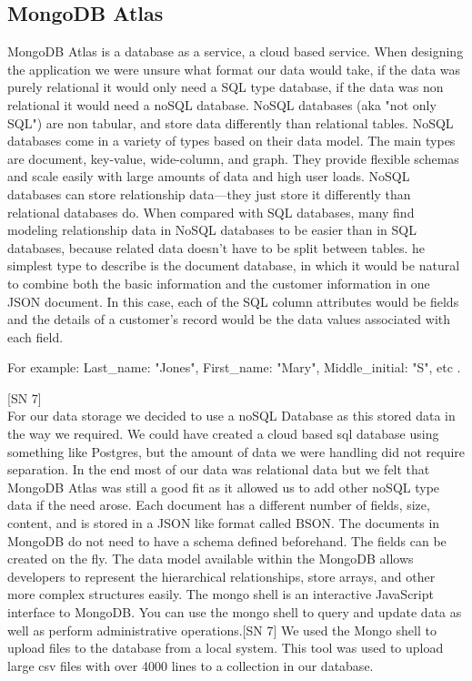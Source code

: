 \subsection{MongoDB Atlas}
MongoDB Atlas is a database as a service, a cloud based service.
When designing the application we were unsure what format our data would take, if the data was purely relational it would only need a SQL type database, if the data was non relational it would need a noSQL database.
NoSQL databases (aka "not only SQL") are non tabular, and store data differently than relational tables. NoSQL databases come in a variety of types based on their data model. The main types are document, key-value, wide-column, and graph. They provide flexible schemas and scale easily with large amounts of data and high user loads.  NoSQL databases can store relationship data—they just store it differently than relational databases do. When compared with SQL databases, many find modeling relationship data in NoSQL databases to be easier than in SQL databases, because related data doesn’t have to be split between tables. he simplest type to describe is the document database, in which it would be natural to combine both the basic information and the customer information in one JSON document. In this case, each of the SQL column attributes would be fields and the details of a customer’s record would be the data values associated with each field.

For example: Last\_name: "Jones", First\_name: "Mary", Middle\_initial: "S", etc .


[SN 7] \\
For our data storage we decided to use a noSQL Database as this stored data in the way we required. We could have created a cloud based sql database using something like Postgres, but the amount of data we were handling did not require separation.
In the end most of our data was relational data but we felt that MongoDB Atlas was still a good fit as it allowed us to add other noSQL type data if the need arose. Each document has a different number of fields, size, content, and is stored in a JSON like format called BSON. The documents in MongoDB do not need to have a schema defined beforehand. The fields can be created on the fly. The data model available within the MongoDB allows developers to represent the hierarchical relationships, store arrays, and other more complex structures easily.
The mongo shell is an interactive JavaScript interface to MongoDB. You can use the mongo shell to query and update data as well as perform administrative operations.[SN 7]
We used the Mongo shell to upload files to the database from a local system. This tool was used to upload large csv files  with over 4000 lines to a collection in our database.

